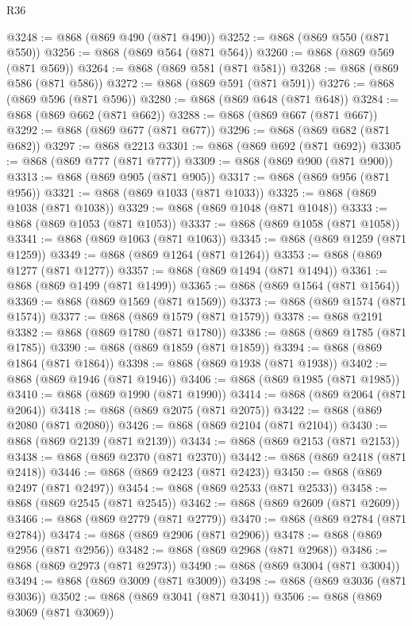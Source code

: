 \begin{lexlean}{R36}
\begin{coremodule}
@3248 := @868 (@869 @490 (@871 @490))
@3252 := @868 (@869 @550 (@871 @550))
@3256 := @868 (@869 @564 (@871 @564))
@3260 := @868 (@869 @569 (@871 @569))
@3264 := @868 (@869 @581 (@871 @581))
@3268 := @868 (@869 @586 (@871 @586))
@3272 := @868 (@869 @591 (@871 @591))
@3276 := @868 (@869 @596 (@871 @596))
@3280 := @868 (@869 @648 (@871 @648))
@3284 := @868 (@869 @662 (@871 @662))
@3288 := @868 (@869 @667 (@871 @667))
@3292 := @868 (@869 @677 (@871 @677))
@3296 := @868 (@869 @682 (@871 @682))
@3297 := @868 @2213
@3301 := @868 (@869 @692 (@871 @692))
@3305 := @868 (@869 @777 (@871 @777))
@3309 := @868 (@869 @900 (@871 @900))
@3313 := @868 (@869 @905 (@871 @905))
@3317 := @868 (@869 @956 (@871 @956))
@3321 := @868 (@869 @1033 (@871 @1033))
@3325 := @868 (@869 @1038 (@871 @1038))
@3329 := @868 (@869 @1048 (@871 @1048))
@3333 := @868 (@869 @1053 (@871 @1053))
@3337 := @868 (@869 @1058 (@871 @1058))
@3341 := @868 (@869 @1063 (@871 @1063))
@3345 := @868 (@869 @1259 (@871 @1259))
@3349 := @868 (@869 @1264 (@871 @1264))
@3353 := @868 (@869 @1277 (@871 @1277))
@3357 := @868 (@869 @1494 (@871 @1494))
@3361 := @868 (@869 @1499 (@871 @1499))
@3365 := @868 (@869 @1564 (@871 @1564))
@3369 := @868 (@869 @1569 (@871 @1569))
@3373 := @868 (@869 @1574 (@871 @1574))
@3377 := @868 (@869 @1579 (@871 @1579))
@3378 := @868 @2191
@3382 := @868 (@869 @1780 (@871 @1780))
@3386 := @868 (@869 @1785 (@871 @1785))
@3390 := @868 (@869 @1859 (@871 @1859))
@3394 := @868 (@869 @1864 (@871 @1864))
@3398 := @868 (@869 @1938 (@871 @1938))
@3402 := @868 (@869 @1946 (@871 @1946))
@3406 := @868 (@869 @1985 (@871 @1985))
@3410 := @868 (@869 @1990 (@871 @1990))
@3414 := @868 (@869 @2064 (@871 @2064))
@3418 := @868 (@869 @2075 (@871 @2075))
@3422 := @868 (@869 @2080 (@871 @2080))
@3426 := @868 (@869 @2104 (@871 @2104))
@3430 := @868 (@869 @2139 (@871 @2139))
@3434 := @868 (@869 @2153 (@871 @2153))
@3438 := @868 (@869 @2370 (@871 @2370))
@3442 := @868 (@869 @2418 (@871 @2418))
@3446 := @868 (@869 @2423 (@871 @2423))
@3450 := @868 (@869 @2497 (@871 @2497))
@3454 := @868 (@869 @2533 (@871 @2533))
@3458 := @868 (@869 @2545 (@871 @2545))
@3462 := @868 (@869 @2609 (@871 @2609))
@3466 := @868 (@869 @2779 (@871 @2779))
@3470 := @868 (@869 @2784 (@871 @2784))
@3474 := @868 (@869 @2906 (@871 @2906))
@3478 := @868 (@869 @2956 (@871 @2956))
@3482 := @868 (@869 @2968 (@871 @2968))
@3486 := @868 (@869 @2973 (@871 @2973))
@3490 := @868 (@869 @3004 (@871 @3004))
@3494 := @868 (@869 @3009 (@871 @3009))
@3498 := @868 (@869 @3036 (@871 @3036))
@3502 := @868 (@869 @3041 (@871 @3041))
@3506 := @868 (@869 @3069 (@871 @3069))

\end{coremodule}
\end{lexlean}
